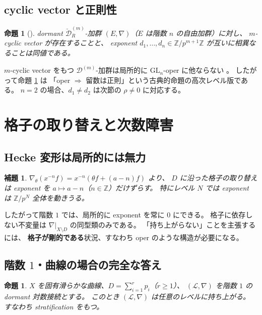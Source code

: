 \documentclass[a4paper,11pt]{ltjsarticle}
\theoremstyle{plain}
\newtheorem{proposition}[theorem]{命題}
\newtheorem{lemma}[theorem]{補題}
\theoremstyle{definition}
\newcommand{\bbZ}{\mathbb{Z}}
\newcommand{\cD}{\mathcal{D}}
\newcommand{\cL}{\mathcal{L}}
\newcommand{\Dbr}[1]{\breve{\cD}^{(#1)}_{R}}
\begin{document}
\subsection{cyclic vector と正則性}

\begin{proposition}[{\cite[Prop.~3.4.1]{Wak}}]\label{prop:cyclic}
dormant $\Dbr{m}$-加群 $(E,\nabla)$（$E$ は階数 $n$ の自由加群）に対し、
$m$-cyclic vector が存在することと、
exponent $d_1,\dots,d_n\in\bbZ/p^{m+1}\bbZ$ が互いに相異なることは同値である。
\end{proposition}

$m$-cyclic vector をもつ $\cD^{(m)}$-加群は局所的に $\mathrm{GL}_n$-oper に他ならない
\cite[Prop.~4.2.3]{Wak}。
したがって命題 \ref{prop:cyclic} は
「oper $\Rightarrow$ 留数は正則」という古典的命題の高次レベル版である。
$n=2$ の場合、$d_1\neq d_2$ は次節の $\rho\neq0$ に対応する。

\section{格子の取り替えと次数障害}\label{sec:lattice}

\subsection{Hecke 変形は局所的には無力}

\begin{lemma}\label{lem:hecke}
$\nabla_\theta(x^{-n}f)=x^{-n}(\theta f+(a-n)f)$ より、
$D$ に沿った格子の取り替えは exponent を $a\mapsto a-n$（$n\in\bbZ$）だけずらす。
特にレベル $N$ では exponent は $\bbZ/p^N$ 全体を動きうる。
\end{lemma}

したがって階数 $1$ では、局所的に exponent を常に $0$ にできる。
格子に依存しない不変量は $\nabla|_{X\setminus D}$ の同型類のみである。
「持ち上がらない」ことを主張するには、
\textbf{格子が剛的である}状況、すなわち oper のような構造が必要になる。

\subsection{階数 $1$・曲線の場合の完全な答え}

\begin{proposition}\label{prop:rank1curve}
$X$ を固有滑らかな曲線、$D=\sum_{i=1}^r p_i$（$r\ge1$）、
$(\cL,\nabla)$ を階数 $1$ の dormant 対数接続とする。
このとき $(\cL,\nabla)$ は任意のレベルに持ち上がる。
すなわち stratification をもつ。
\end{proposition}
\end{document}
